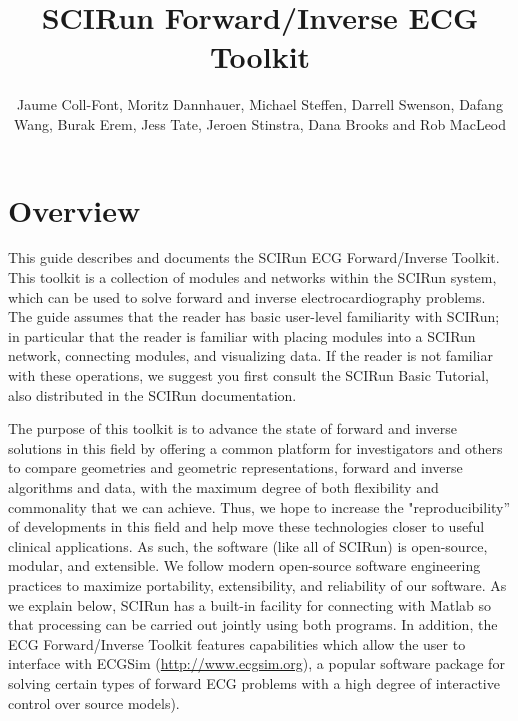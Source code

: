 \documentclass[fleqn,11pt,openany]{book}
\title{SCIRun Forward/Inverse ECG Toolkit}
\author{Jaume Coll-Font, Moritz Dannhauer, Michael Steffen, Darrell Swenson, Dafang Wang, Burak Erem, Jess Tate, Jeroen Stinstra, Dana Brooks and Rob MacLeod}
\begin{document}


\maketitle


%
\chapter{Overview}

\begin{introduction}

This guide describes and documents the SCIRun ECG Forward/Inverse
Toolkit. This toolkit is a collection of modules and networks
within the SCIRun system, which can be used to solve forward and inverse
electrocardiography problems. The guide assumes that the reader has basic
user-level familiarity with SCIRun; in particular that the reader is
familiar with placing modules into a SCIRun network, connecting modules,
and visualizing data. If the reader is not familiar with these operations,
we suggest you first consult the SCIRun Basic Tutorial, also distributed in
the SCIRun documentation.

The purpose of this toolkit is to advance the state of forward and inverse
solutions in this field by offering a common platform for investigators and
others to compare geometries and geometric representations, forward and inverse algorithms and data, with the maximum degree of both flexibility
and commonality that we can achieve. Thus, we hope to increase the
"reproducibility'' of developments in this field and help
move these technologies closer to useful clinical applications. As such, the
software (like all of SCIRun) is open-source, modular, and extensible. We
follow modern open-source software engineering practices to maximize
portability, extensibility, and reliability of our software. As we explain below, SCIRun has a
built-in facility for connecting with Matlab so that processing can be
carried out jointly using both programs. In
addition, the ECG Forward/Inverse Toolkit features capabilities which allow
the user to interface with ECGSim (\href{http://www.ecgsim.org}{http://www.ecgsim.org}), a
popular software package for solving certain types of forward ECG problems
with a high degree of interactive control over source models).


\end{introduction}
\end{document}
